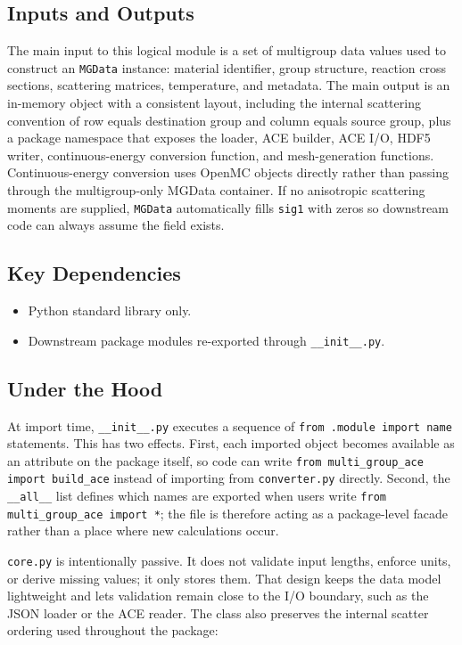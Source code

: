 \documentclass[11pt]{article}
\begin{document}
\subsection*{Inputs and Outputs}
The main input to this logical module is a set of multigroup data values used to construct an \texttt{MGData} instance: material identifier, group structure, reaction cross sections, scattering matrices, temperature, and metadata. The main output is an in-memory object with a consistent layout, including the internal scattering convention of row equals destination group and column equals source group, plus a package namespace that exposes the loader, ACE builder, ACE I/O, HDF5 writer, continuous-energy conversion function, and mesh-generation functions. Continuous-energy conversion uses OpenMC objects directly rather than passing through the multigroup-only MGData container. If no anisotropic scattering moments are supplied, \texttt{MGData} automatically fills \texttt{sig1} with zeros so downstream code can always assume the field exists.

\subsection*{Key Dependencies}
\begin{itemize}
\item Python standard library only.
\item Downstream package modules re-exported through \texttt{\_\_init\_\_.py}.
\end{itemize}

\subsection*{Under the Hood}
At import time, \texttt{\_\_init\_\_.py} executes a sequence of \texttt{from .module import name} statements. This has two effects. First, each imported object becomes available as an attribute on the package itself, so code can write \texttt{from multi\_group\_ace import build\_ace} instead of importing from \texttt{converter.py} directly. Second, the \texttt{\_\_all\_\_} list defines which names are exported when users write \texttt{from multi\_group\_ace import *}; the file is therefore acting as a package-level facade rather than a place where new calculations occur.

\texttt{core.py} is intentionally passive. It does not validate input lengths, enforce units, or derive missing values; it only stores them. That design keeps the data model lightweight and lets validation remain close to the I/O boundary, such as the JSON loader or the ACE reader. The class also preserves the internal scatter ordering used throughout the package:
\end{document}
